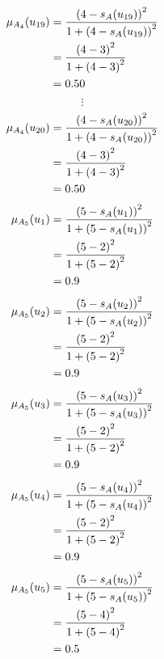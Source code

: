 \documentclass[a4paper,openany]{book}
\begin{document}
				\begin{align}
					\mu_{A_4}(u_{19}) &= \frac{\left(4-s_A(u_{19})\right)^2}{1 + \left(4-s_A(u_{19})\right)^2}\\
					&= \frac{\left(4-3\right)^2}{1 + \left(4-3\right)^2} \notag \\
					&= 0.50 \notag
				\end{align}
				\[
					\vdots
				\]
				\begin{align}
					\mu_{A_4}(u_{20}) &= \frac{\left(4-s_A(u_{20})\right)^2}{1 + \left(4-s_A(u_{20})\right)^2}\\
					&= \frac{\left(4-3\right)^2}{1 + \left(4-3\right)^2} \notag \\
					&= 0.50 \notag
				\end{align}
				\begin{align}
					\mu_{A_5}(u_1) &= \frac{\left(5-s_A(u_1)\right)^2}{1 + \left(5-s_A(u_1)\right)^2}\\
					&= \frac{\left(5-2\right)^2}{1 + \left(5-2\right)^2} \notag \\
					&= 0.9 \notag
				\end{align}
				\begin{align}
					\mu_{A_5}(u_2) &= \frac{\left(5-s_A(u_2)\right)^2}{1 + \left(5-s_A(u_2)\right)^2}\\
					&= \frac{\left(5-2\right)^2}{1 + \left(5-2\right)^2} \notag \\
					&= 0.9 \notag
				\end{align}
				\begin{align}
					\mu_{A_5}(u_3) &= \frac{\left(5-s_A(u_3)\right)^2}{1 + \left(5-s_A(u_3)\right)^2}\\
					&= \frac{\left(5-2\right)^2}{1 + \left(5-2\right)^2} \notag \\
					&= 0.9 \notag
				\end{align}
				\begin{align}
					\mu_{A_5}(u_4) &= \frac{\left(5-s_A(u_4)\right)^2}{1 + \left(5-s_A(u_4)\right)^2}\\
					&= \frac{\left(5-2\right)^2}{1 + \left(5-2\right)^2} \notag \\
					&= 0.9 \notag
				\end{align}
				\begin{align}
					\mu_{A_5}(u_5) &= \frac{\left(5-s_A(u_5)\right)^2}{1 + \left(5-s_A(u_5)\right)^2}\\
					&= \frac{\left(5-4\right)^2}{1 + \left(5-4\right)^2} \notag \\
					&= 0.5 \notag
				\end{align}
\end{document}
